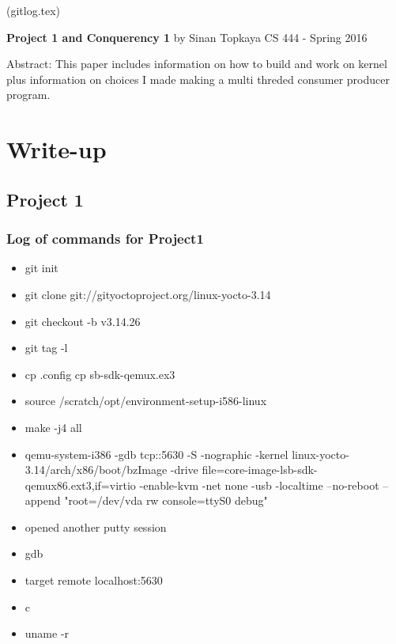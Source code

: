 \documentclass[letterpaper,10pt,draftclsnofoot,onecolumn]{IEEEtran}
\begin{document}
	(gitlog.tex)
	\begin{titlepage}
		
		\begin{center}
		\bigbreak	
		\textbf{Project 1 and Conquerency 1}
		\bigbreak
		by Sinan Topkaya
		\smallbreak
		CS 444 - Spring 2016
		\end{center}
		\vfill
		
		Abstract: This paper includes information on how to build and work on kernel plus information on choices I made making a multi threded consumer producer program.
		
	\end{titlepage}

\section*{Write-up}
\subsection*{Project 1}

\subsubsection*{Log of commands for Project1} 
\begin{itemize}
	\item git init  
	\item git clone git://gityoctoproject.org/linux-yocto-3.14 
	\item git checkout -b v3.14.26 
	\item git tag -l 
	\item cp .config cp sb-sdk-qemux.ex3 
	\item source /scratch/opt/environment-setup-i586-linux 
	\item make -j4 all 
	\item qemu-system-i386 -gdb tcp::5630 -S -nographic -kernel linux-yocto-3.14/arch/x86/boot/bzImage -drive file=core-image-lsb-sdk-qemux86.ext3,if=virtio -enable-kvm -net none -usb -localtime --no-reboot --append "root=/dev/vda rw console=ttyS0 debug" 
	\item opened another putty session 
	\item gdb 
	\item target remote localhost:5630 
	\item c 
	\item uname -r 
\end{itemize}
\end{document}
